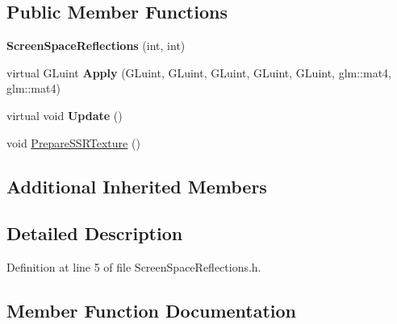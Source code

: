 \subsection*{Public Member Functions}
\begin{DoxyCompactItemize}
\item 
{\bfseries Screen\+Space\+Reflections} (int, int)\hypertarget{class_post_process_1_1_screen_space_reflections_a48e5f1a967f6406a877e85a0700a0968}{}\label{class_post_process_1_1_screen_space_reflections_a48e5f1a967f6406a877e85a0700a0968}

\item 
virtual G\+Luint {\bfseries Apply} (G\+Luint, G\+Luint, G\+Luint, G\+Luint, G\+Luint, glm\+::mat4, glm\+::mat4)\hypertarget{class_post_process_1_1_screen_space_reflections_a19f6cd01d90cd15dafb303aa1de77d96}{}\label{class_post_process_1_1_screen_space_reflections_a19f6cd01d90cd15dafb303aa1de77d96}

\item 
virtual void {\bfseries Update} ()\hypertarget{class_post_process_1_1_screen_space_reflections_ae2e64e78a33a4e1933840c2c09bf4a3e}{}\label{class_post_process_1_1_screen_space_reflections_ae2e64e78a33a4e1933840c2c09bf4a3e}

\item 
void \hyperlink{class_post_process_1_1_screen_space_reflections_a787361b601314ae83fcb5838ff3ec89d}{Prepare\+S\+S\+R\+Texture} ()
\end{DoxyCompactItemize}
\subsection*{Additional Inherited Members}


\subsection{Detailed Description}


Definition at line 5 of file Screen\+Space\+Reflections.\+h.



\subsection{Member Function Documentation}
